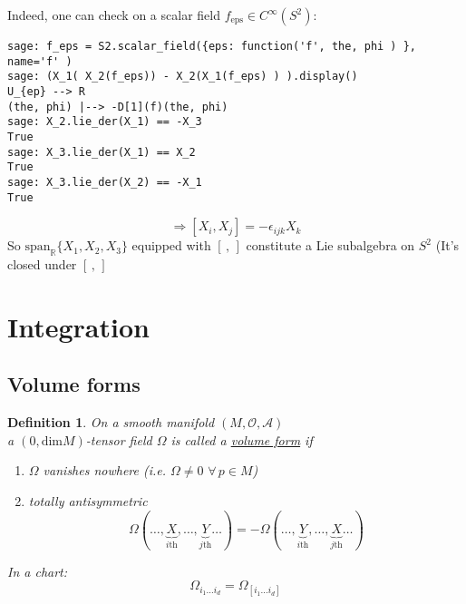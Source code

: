 \documentclass[10pt, twoside]{amsart}
\newtheorem{definition}{Definition}
\begin{document}
\begin{multicols*}{2}
Indeed, one can check on a scalar field $f_{\text{eps}} \in C^{\infty}(S^2)$:
{\small
\begin{verbatim}
sage: f_eps = S2.scalar_field({eps: function('f', the, phi ) }, name='f' )
sage: (X_1( X_2(f_eps)) - X_2(X_1(f_eps) ) ).display()
U_{ep} --> R
(the, phi) |--> -D[1](f)(the, phi)
sage: X_2.lie_der(X_1) == -X_3
True
sage: X_3.lie_der(X_1) == X_2
True
sage: X_3.lie_der(X_2) == -X_1
True
\end{verbatim}
}

\[
\Longrightarrow \boxed{ [X_i, X_j] = -\epsilon_{ijk}X_k }
\]
So $\text{span}_{\mathbb{R}} \lbrace X_1,X_2,X_3 \rbrace$ equipped with $[ \, , \, ]$ constitute a Lie subalgebra on $S^2$ (It's closed under $[ \, , \, ]$

\section{Integration}

\subsection{}

\subsection{}

\subsection{Volume forms}

\begin{definition}
On a smooth manifold $(M,\mathcal{O},\mathcal{A})$ \\
a $(0,\text{dim}M)$-tensor field $\Omega$ is called a \underline{volume form} if 
\begin{enumerate}
\item[(a)] $\Omega$ vanishes nowhere (i.e. $\Omega \neq 0 \, \, \forall \, p \in M$) 
\item[(b)] totally antisymmetric 
\[
\Omega(\dots , \underbrace{X}_{i\text{th}} , \dots , \underbrace{Y}_{j\text{th}} \dots ) = - \Omega(\dots , \underbrace{Y}_{i\text{th}} , \dots , \underbrace{X}_{j\text{th}} \dots )
\]
\end{enumerate}

In a chart: 
\[
\Omega_{i_1 \dots i_d} = \Omega_{ [i_1 \dots i_d ]}
\]
\end{definition}


\end{multicols*}
\end{document}

